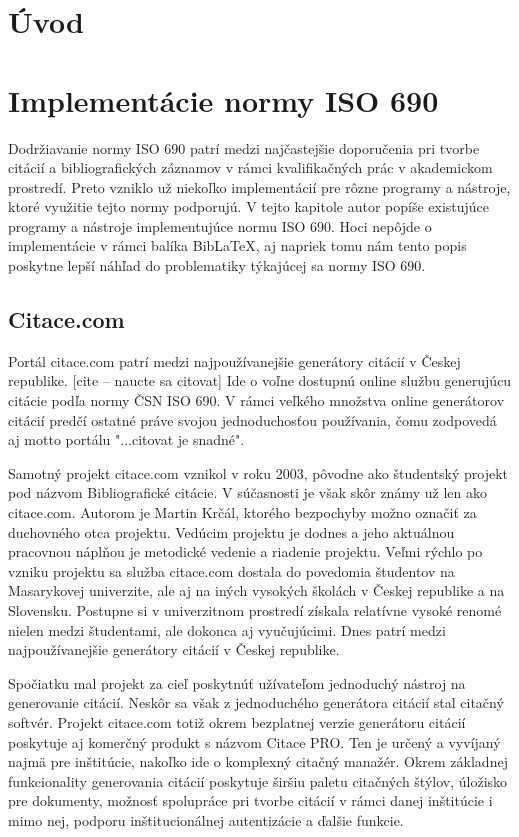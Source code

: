 \documentclass{fithesis3}
\begin{document}
\chapter{Úvod}

\chapter{Implementácie normy ISO 690}
Dodržiavanie normy ISO 690 patrí medzi najčastejšie doporučenia pri tvorbe citácií a bibliografických záznamov v rámci kvalifikačných prác v akademickom prostredí. Preto vzniklo už niekoľko implementácií pre rôzne programy a nástroje, ktoré využitie tejto normy podporujú. V tejto kapitole autor popíše existujúce programy a nástroje implementujúce normu ISO 690. Hoci nepôjde o implementácie v rámci balíka Bib\LaTeX, aj napriek tomu nám tento popis poskytne lepší náhľad do problematiky týkajúcej sa normy ISO 690.

	\section{Citace.com}
	Portál citace.com patrí medzi najpoužívanejšie generátory citácií v Českej republike. [cite -- naucte sa citovat] Ide o voľne dostupnú online službu generujúcu citácie podľa normy ČSN ISO 690. V rámci veľkého množstva online generátorov citácií predčí ostatné práve svojou jednoduchosťou používania, čomu zodpovedá aj motto portálu "...citovat je snadné".

	Samotný projekt citace.com vznikol v roku 2003, pôvodne ako študentský projekt pod názvom Bibliografické citácie. V súčasnosti je však skôr známy už len ako citace.com. Autorom je Martin Krčál, ktorého bezpochyby možno označiť za duchovného otca projektu. Vedúcim projektu je dodnes a jeho aktuálnou pracovnou náplňou je metodické vedenie a riadenie projektu. Veľmi rýchlo po vzniku projektu sa služba citace.com dostala do povedomia študentov na Masarykovej univerzite, ale aj na iných vysokých školách v Českej republike a na Slovensku. Postupne si v univerzitnom prostredí získala relatívne vysoké renomé nielen medzi študentami, ale dokonca aj vyučujúcimi. Dnes patrí medzi najpoužívanejšie generátory citácií v Českej republike.

	Spočiatku mal projekt za cieľ poskytnúť užívateľom jednoduchý nástroj na generovanie citácií. Neskôr sa však z jednoduchého generátora citácií stal citačný softvér. Projekt citace.com totiž okrem bezplatnej verzie generátoru citácií poskytuje aj komerčný produkt s názvom Citace PRO. Ten je určený a vyvíjaný najmä pre inštitúcie, nakoľko ide o komplexný citačný manažér. Okrem základnej funkcionality generovania citácií poskytuje širšiu paletu citačných štýlov, úložisko pre dokumenty, možnosť spolupráce pri tvorbe citácií v rámci danej inštitúcie i mimo nej, podporu inštitucionálnej autentizácie a ďalšie funkcie.
\end{document}

